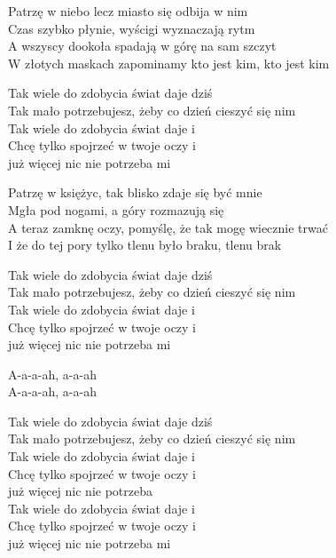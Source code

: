 \begin{text}
    Patrzę w niebo lecz miasto się odbija w nim\\
    Czas szybko płynie, wyścigi wyznaczają rytm\\
    A wszyscy dookoła spadają w górę na sam szczyt\\
    W złotych maskach zapominamy kto jest kim, kto jest kim

    Tak wiele do zdobycia świat daje dziś\\
    Tak mało potrzebujesz, żeby co dzień cieszyć się nim\\
    Tak wiele do zdobycia świat daje i\\
    Chcę tylko spojrzeć w twoje oczy i\\
    już więcej nic nie potrzeba mi

    Patrzę w księżyc, tak blisko zdaje się być mnie\\
    Mgła pod nogami, a góry rozmazują się\\
    A teraz zamknę oczy, pomyślę, że tak mogę wiecznie trwać\\
    I że do tej pory tylko tlenu było braku, tlenu brak

    Tak wiele do zdobycia świat daje dziś\\
    Tak mało potrzebujesz, żeby co dzień cieszyć się nim\\
    Tak wiele do zdobycia świat daje i\\
    Chcę tylko spojrzeć w twoje oczy i\\
    już więcej nic nie potrzeba mi

    A-a-a-ah, a-a-ah\\
    A-a-a-ah, a-a-ah

    Tak wiele do zdobycia świat daje dziś\\
    Tak mało potrzebujesz, żeby co dzień cieszyć się nim\\
    Tak wiele do zdobycia świat daje i\\
    Chcę tylko spojrzeć w twoje oczy i\\
    już więcej nic nie potrzeba\\
    Tak wiele do zdobycia świat daje i\\
    Chcę tylko spojrzeć w twoje oczy i\\
    już więcej nic nie potrzeba mi
\end{text}
\begin{chord}

\end{chord}